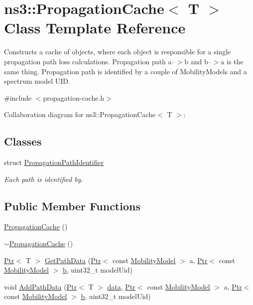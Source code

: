 \hypertarget{classns3_1_1PropagationCache}{}\section{ns3\+:\+:Propagation\+Cache$<$ T $>$ Class Template Reference}
\label{classns3_1_1PropagationCache}


Constructs a cache of objects, where each object is responsible for a single propagation path loss calculations. Propagation path a--$>$b and b--$>$a is the same thing. Propagation path is identified by a couple of Mobility\+Models and a spectrum model U\+ID.  




{\ttfamily \#include $<$propagation-\/cache.\+h$>$}



Collaboration diagram for ns3\+:\+:Propagation\+Cache$<$ T $>$\+:
\subsection*{Classes}
\begin{DoxyCompactItemize}
\item 
struct \hyperlink{structns3_1_1PropagationCache_1_1PropagationPathIdentifier}{Propagation\+Path\+Identifier}
\begin{DoxyCompactList}\small\item\em Each path is identified by. \end{DoxyCompactList}\end{DoxyCompactItemize}
\subsection*{Public Member Functions}
\begin{DoxyCompactItemize}
\item 
\hyperlink{classns3_1_1PropagationCache_a6be0ba2db2e2ad323c1cea4fa22e6604}{Propagation\+Cache} ()
\item 
\hyperlink{classns3_1_1PropagationCache_abe918d582b0c78406abd6e43734ec78e}{$\sim$\+Propagation\+Cache} ()
\item 
\hyperlink{classns3_1_1Ptr}{Ptr}$<$ T $>$ \hyperlink{classns3_1_1PropagationCache_afedf9d64e689a00969bffda93ee1a9ce}{Get\+Path\+Data} (\hyperlink{classns3_1_1Ptr}{Ptr}$<$ const \hyperlink{classns3_1_1MobilityModel}{Mobility\+Model} $>$ a, \hyperlink{classns3_1_1Ptr}{Ptr}$<$ const \hyperlink{classns3_1_1MobilityModel}{Mobility\+Model} $>$ \hyperlink{lte__pathloss_8m_a21ad0bd836b90d08f4cf640b4c298e7c}{b}, uint32\+\_\+t model\+Uid)
\item 
void \hyperlink{classns3_1_1PropagationCache_adfbe59fe10ec126f09ace4081ceb2ad4}{Add\+Path\+Data} (\hyperlink{classns3_1_1Ptr}{Ptr}$<$ T $>$ \hyperlink{topology-example-sim_8cc_a26c65296e316af77b787dc77469bb2a4}{data}, \hyperlink{classns3_1_1Ptr}{Ptr}$<$ const \hyperlink{classns3_1_1MobilityModel}{Mobility\+Model} $>$ a, \hyperlink{classns3_1_1Ptr}{Ptr}$<$ const \hyperlink{classns3_1_1MobilityModel}{Mobility\+Model} $>$ \hyperlink{lte__pathloss_8m_a21ad0bd836b90d08f4cf640b4c298e7c}{b}, uint32\+\_\+t model\+Uid)
\end{DoxyCompactItemize}
